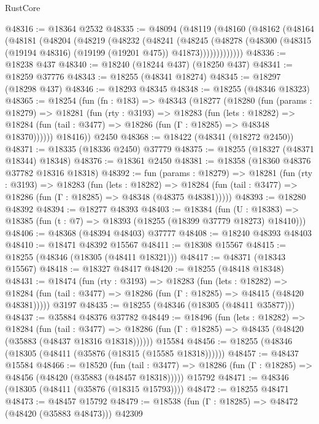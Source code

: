\begin{lexlean}{RustCore}
\begin{coremodule}
@48316 := @18364 @2532
@48335 := @48094
    (@48119
      (@48160
        (@48162
          (@48164
            (@48181
              (@48204
                (@48219
                  (@48232
                    (@48241
                      (@48245
                        (@48278
                          (@48300 (@48315 (@19194 @48316) (@19199 (@19201 @475)) @41873)))))))))))))
@48336 := @18238 @437
@48340 := @18240 (@18244 @437) (@18250 @437)
@48341 := @18259 @37776
@48343 := @18255 (@48341 @18274)
@48345 := @18297 (@18298 @437)
@48346 := @18293 @48345
@48348 := @18255 (@48346 @18323)
@48365 := @18254
    (fun (fn : @183) =>
    @48343
      (@18277
        (@18280
          (fun (params : @18279) =>
          @18281
            (fun (rty : @3193) =>
            @18283
              (fun (lets : @18282) =>
              @18284 (fun (tail : @3477) => @18286 (fun (Γ : @18285) => @48348 @18370))))))
        @18416))
    @2450
@48368 := @18422 (@48341 (@18272 @2450))
@48371 := @18335 (@18336 @2450) @37779
@48375 := @18255 (@18327 (@48371 @18344) @18348)
@48376 := @18361 @2450
@48381 := @18358 (@18360 @48376 @37782 @18316 @18318)
@48392 := fun (params : @18279) =>
  @18281
    (fun (rty : @3193) =>
    @18283
      (fun (lets : @18282) =>
      @18284 (fun (tail : @3477) => @18286 (fun (Γ : @18285) => @48348 (@48375 @48381)))))
@48393 := @18280 @48392
@48394 := @18277 @48393
@48403 := @18384
    (fun (U : @18383) => @18385 (fun (t : @7) => @18393 (@18255 (@18399 @37779 @18273) @18410)))
@48406 := @48368 (@48394 @48403) @37777
@48408 := @18240 @48393 @48403
@48410 := @18471 @48392 @15567
@48411 := @18308 @15567
@48415 := @18255 (@48346 (@18305 (@48411 @18321)))
@48417 := @48371 (@18343 @15567)
@48418 := @18327 @48417
@48420 := @18255 (@48418 @18348)
@48431 := @18474
    (fun (rty : @3193) =>
    @18283
      (fun (lets : @18282) =>
      @18284 (fun (tail : @3477) => @18286 (fun (Γ : @18285) => @48415 (@48420 @48381)))))
    @3197
@48435 := @18255 (@48346 (@18305 (@48411 @35877)))
@48437 := @35884 @48376 @37782
@48449 := @18496
    (fun (lets : @18282) =>
    @18284
      (fun (tail : @3477) =>
      @18286 (fun (Γ : @18285) => @48435 (@48420 (@35883 (@48437 @18316 @18318))))))
    @15584
@48456 := @18255 (@48346 (@18305 (@48411 (@35876 (@18315 (@15585 @18318))))))
@48457 := @48437 @15584
@48466 := @18520
    (fun (tail : @3477) => @18286 (fun (Γ : @18285) => @48456 (@48420 (@35883 (@48457 @18318)))))
    @15792
@48471 := @48346 (@18305 (@48411 (@35876 (@18315 @15793))))
@48472 := @18255 @48471
@48473 := @48457 @15792
@48479 := @18538 (fun (Γ : @18285) => @48472 (@48420 (@35883 @48473))) @42309

\end{coremodule}
\end{lexlean}
